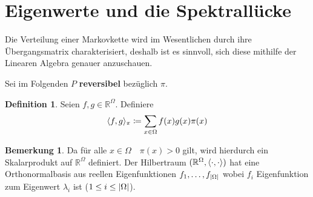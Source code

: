 \documentclass[a4paper,11pt]{scrartcl}
\theoremstyle{plain}
\theoremstyle{definition}
\newtheorem{defn}[thm]{Definition}
\newtheorem{rem}[thm]{Bemerkung}
\DeclarePairedDelimiter{\sprod}{\langle}{\rangle}	%
\DeclarePairedDelimiter{\abs}{\lvert}{\rvert}		%
\begin{document}
\section{Eigenwerte und die Spektrallücke}
Die Verteilung einer Markovkette wird im Wesentlichen durch ihre Übergangsmatrix
charakterisiert, deshalb ist es sinnvoll, sich diese mithilfe der Linearen
Algebra genauer anzuschauen.

Sei im Folgenden $P$ \textbf{reversibel} bezüglich $\pi$.
\begin{defn}
  Seien $f, g\in\mathbb{R}^\Omega$. Definiere
  \begin{equation*}
    \sprod{f,g}_\pi\coloneqq\sum_{x\in\Omega}f(x)g(x)\pi(x)
  \end{equation*}
\end{defn}

\begin{rem}
 Da für alle $x\in\Omega\quad\pi(x)>0$ gilt, wird hierdurch ein Skalarprodukt auf
 $\mathbb{R}^\Omega$ definiert. Der Hilbertraum $(\mathbb{R}^\Omega,
 \sprod{\cdot,\cdot})$ hat eine Orthonormalbasis aus reellen Eigenfunktionen
 $f_1,\dots, f_{\abs{\Omega}}$ wobei $f_i$ Eigenfunktion zum Eigenwert
 $\lambda_i$ ist ($1\leq i\leq\abs{\Omega}$). 
\end{rem}
\end{document}
